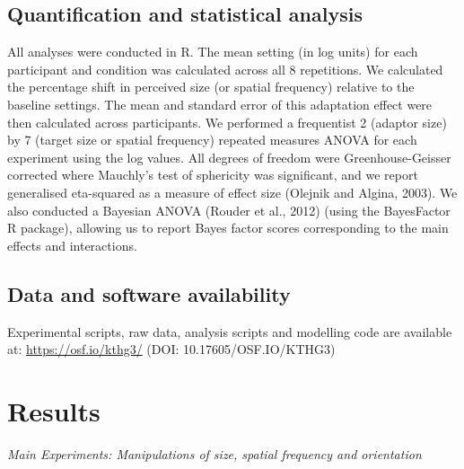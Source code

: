 \documentclass[
]{article}
\begin{document}
\hypertarget{quantification-and-statistical-analysis}{%
\subsection*{Quantification and statistical analysis}\label{quantification-and-statistical-analysis}}

All analyses were conducted in R. The mean setting (in log units) for each participant and condition was calculated across all 8 repetitions. We calculated the percentage shift in perceived size (or spatial frequency) relative to the baseline settings. The mean and standard error of this adaptation effect were then calculated across participants. We performed a frequentist 2 (adaptor size) by 7 (target size or spatial frequency) repeated measures ANOVA for each experiment using the log values. All degrees of freedom were Greenhouse-Geisser corrected where Mauchly's test of sphericity was significant, and we report generalised eta-squared as a measure of effect size (Olejnik and Algina, 2003). We also conducted a Bayesian ANOVA (Rouder et al., 2012) (using the BayesFactor R package), allowing us to report Bayes factor scores corresponding to the main effects and interactions.

\hypertarget{data-and-software-availability}{%
\subsection*{Data and software availability}\label{data-and-software-availability}}

Experimental scripts, raw data, analysis scripts and modelling code are available at: \url{https://osf.io/kthg3/} (DOI: 10.17605/OSF.IO/KTHG3)

\hypertarget{results}{%
\section*{Results}\label{results}}

\emph{Main Experiments: Manipulations of size, spatial frequency and orientation}
\end{document}
